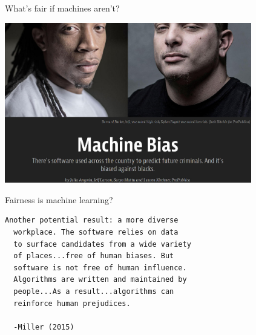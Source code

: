 \documentclass[12pt,t,handout]{beamer}
\begin{document}

\begin{frame}[fragile,c]{What's fair if machines aren't?}

\begin{center}
\includegraphics[height=70mm]{Figs/propublica.jpg}
\end{center}

\note{
}

\end{frame}


\begin{frame}[fragile,c]{Fairness is machine learning?}

\begin{center}
\begin{minipage}[c]{11.25cm}
\begin{semiverbatim}
\lstset{basicstyle=\normalsize}
\begin{lstlisting}[linewidth=11.25cm]
  Another potential result: a more diverse
  workplace. The software relies on data
  to surface candidates from a wide variety
  of places...free of human biases. But
  software is not free of human influence.
  Algorithms are written and maintained by
  people...As a result...algorithms can
  reinforce human prejudices.

  -Miller (2015)
\end{lstlisting}
\end{semiverbatim}
\end{minipage}
\end{center}


\end{frame}
\end{document}
